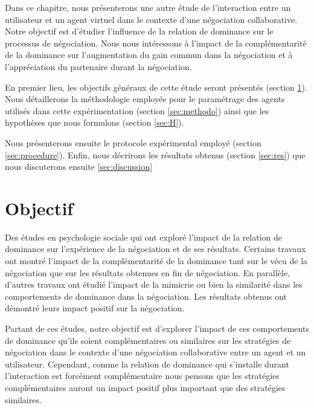 Dans ce chapitre, nous présenterons une autre étude de l'interaction entre un utilisateur et un agent virtuel dans le contexte d'une négociation collaborative. 
Notre objectif est d'étudier l'influence de la relation de dominance sur le processus de négociation. Nous nous intéressons à l'impact de la complémentarité de la dominance sur l'augmentation du gain commun dans la négociation et à l'appréciation du partenaire durant la négociation.

En premier lieu, les objectifs généraux de cette étude seront présentés (section \ref{sec:obj}). Nous détaillerons la méthodologie employée pour le paramétrage des agents utilisés dans cette expérimentation (section \ref{sec:methodo}) ainsi que les hypothèses que nous formulons (section \ref{sec:H}).

Nous présenterons ensuite le protocole expérimental employé (section \ref{sec:procedure}). Enfin, nous décrirons les résultats obtenus  (section \ref{sec:res})
que nous discuterons ensuite \ref{sec:discussion}
\section{Objectif}
\label{sec:obj}

Des études en psychologie sociale qui ont exploré l'impact de la relation de dominance sur l'expérience de la négociation et de ses résultats. Certains travaux ont montré l'impact de la complémentarité de la dominance tant sur le vécu de la négociation que sur les résultats obtenues en fin de négociation.
En parallèle, d'autres travaux ont étudié l'impact de la mimicrie ou bien la similarité dans les comportements de dominance dans la négociation. Les résultats obtenus ont démontré leurs impact positif sur la négociation.

Partant de ces études, notre objectif est d'explorer l'impact de ces comportements de dominance qu'ils soient complémentaires ou similaires sur les stratégies de négociation dans le contexte d'une négociation collaborative entre un agent et un utilisateur. Cependant, comme la relation de dominance qui s'installe durant l'interaction est forcément complémentaire nous pensons que les stratégies complémentaires auront un impact positif plus important que des stratégies similaires.

